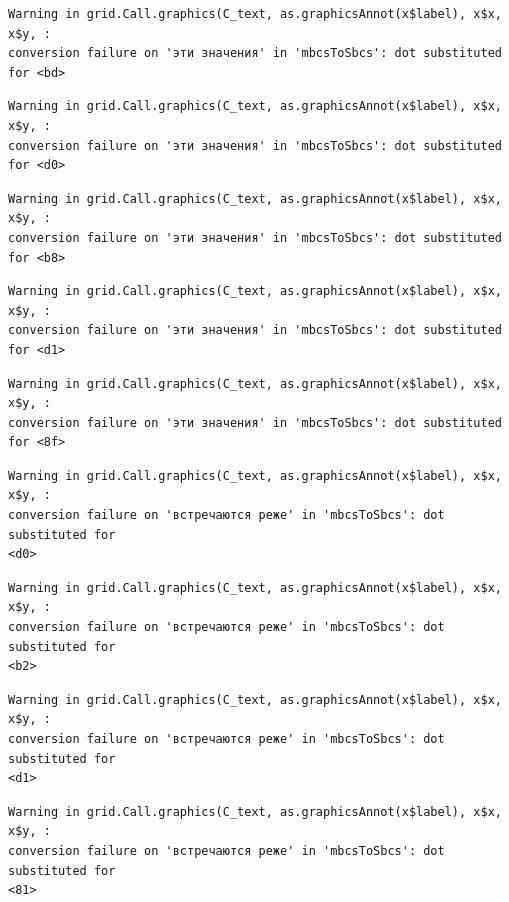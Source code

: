 \documentclass[
  letterpaper,
]{scrbook}
\theoremstyle{definition}
\theoremstyle{remark}
\begin{document}
\begin{verbatim}
Warning in grid.Call.graphics(C_text, as.graphicsAnnot(x$label), x$x, x$y, :
conversion failure on 'эти значения' in 'mbcsToSbcs': dot substituted for <bd>
\end{verbatim}

\begin{verbatim}
Warning in grid.Call.graphics(C_text, as.graphicsAnnot(x$label), x$x, x$y, :
conversion failure on 'эти значения' in 'mbcsToSbcs': dot substituted for <d0>
\end{verbatim}

\begin{verbatim}
Warning in grid.Call.graphics(C_text, as.graphicsAnnot(x$label), x$x, x$y, :
conversion failure on 'эти значения' in 'mbcsToSbcs': dot substituted for <b8>
\end{verbatim}

\begin{verbatim}
Warning in grid.Call.graphics(C_text, as.graphicsAnnot(x$label), x$x, x$y, :
conversion failure on 'эти значения' in 'mbcsToSbcs': dot substituted for <d1>
\end{verbatim}

\begin{verbatim}
Warning in grid.Call.graphics(C_text, as.graphicsAnnot(x$label), x$x, x$y, :
conversion failure on 'эти значения' in 'mbcsToSbcs': dot substituted for <8f>
\end{verbatim}

\begin{verbatim}
Warning in grid.Call.graphics(C_text, as.graphicsAnnot(x$label), x$x, x$y, :
conversion failure on 'встречаются реже' in 'mbcsToSbcs': dot substituted for
<d0>
\end{verbatim}

\begin{verbatim}
Warning in grid.Call.graphics(C_text, as.graphicsAnnot(x$label), x$x, x$y, :
conversion failure on 'встречаются реже' in 'mbcsToSbcs': dot substituted for
<b2>
\end{verbatim}

\begin{verbatim}
Warning in grid.Call.graphics(C_text, as.graphicsAnnot(x$label), x$x, x$y, :
conversion failure on 'встречаются реже' in 'mbcsToSbcs': dot substituted for
<d1>
\end{verbatim}

\begin{verbatim}
Warning in grid.Call.graphics(C_text, as.graphicsAnnot(x$label), x$x, x$y, :
conversion failure on 'встречаются реже' in 'mbcsToSbcs': dot substituted for
<81>
\end{verbatim}
\end{document}
